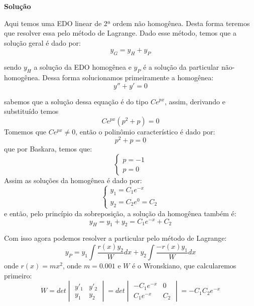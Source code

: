 \linespread{1.5}

\textbf{Solução}

Aqui temos uma EDO linear de 2ª ordem não homogênea. Desta forma teremos que resolver essa pelo método de Lagrange. Dado esse método, temos que a solução geral é dado por:
\begin{equation*}
    y_G = y_H + y_P
\end{equation*}

sendo $y_H$ a solução da EDO homogênea e $y_P$ é a solução da particular não-homogênea. Dessa forma solucionamos primeiramente a homogênea:
\begin{equation*}
    y''+y'=0
\end{equation*}

sabemos que a solução dessa equação é do tipo $Ce^{px}$, assim, derivando e substituído temos 
\begin{equation*}
    Ce^{px}(p^2+p)=0
\end{equation*}
Tomemos que $Ce^{px} \neq 0 $, então o polinômio característico é dado por:
\begin{equation*}
    p^2 + p=0
\end{equation*}
que por Baskara, temos que:
\begin{equation*}
    \begin{cases}
    p = -1\\
    p = 0
    \end{cases}
\end{equation*}
Assim as soluções da homogênea é dado por:
\begin{equation*}
    \begin{cases}
    y_1 = C_1e^{-x}\\
    y_2 = C_2e^{0} = C_2
    \end{cases}
\end{equation*}
e então, pelo princípio da sobreposição, a solução da homogênea também é:
\begin{equation*}
    y_H = y_1 + y_2 = C_1e^{-x} + C_2 
\end{equation*}

Com isso agora podemos resolver a particular pelo método de Lagrange:
\begin{equation*}
    y_P = y_1\int \frac{r(x)y_2}{W}dx + y_2\int \frac{-r(x)y_1}{W} dx
\end{equation*}
onde $r(x) = mx^2$, onde $m =0.001$ e $W$ é o Wronskiano, que calcularemos primeiro:
\begin{equation*}
    W = det\begin{vmatrix}
    y'_1 & y'_2\\
    y_1 & y_2
    \end{vmatrix} = det\begin{vmatrix}
    -C_1e^{-x} & 0 \\
    C_1e^{-x} & C_2
    \end{vmatrix} = -C_1C_2e^{-x}
\end{equation*}

